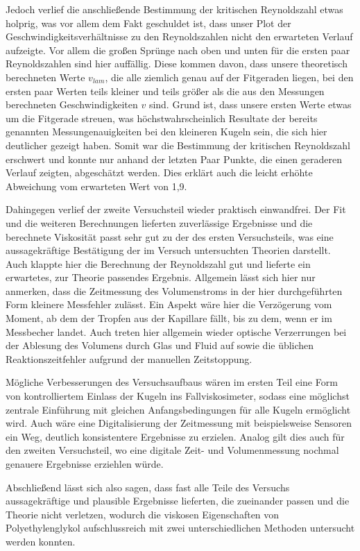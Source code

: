 \documentclass{article}
\begin{document}
Jedoch verlief die anschließende Bestimmung der kritischen Reynoldszahl etwas holprig, was vor allem dem Fakt geschuldet ist, dass unser Plot der Geschwindigkeitsverhältnisse zu den Reynoldszahlen nicht den erwarteten Verlauf aufzeigte. Vor allem die großen Sprünge nach oben und unten für die ersten paar Reynoldszahlen sind hier auffällig. Diese kommen davon, dass unsere theoretisch berechneten Werte $v_{lam}$, die alle ziemlich genau auf der Fitgeraden liegen, bei den ersten paar Werten teils kleiner und teils größer als die aus den Messungen berechneten Geschwindigkeiten $v$ sind. Grund ist, dass unsere ersten Werte etwas um die Fitgerade streuen, was höchstwahrscheinlich Resultate der bereits genannten Messungenauigkeiten bei den kleineren Kugeln sein, die sich hier deutlicher gezeigt haben. Somit war die Bestimmung der kritischen Reynoldszahl erschwert und konnte nur anhand der letzten Paar Punkte, die einen geraderen Verlauf zeigten, abgeschätzt werden. Dies erklärt auch die leicht erhöhte Abweichung vom erwarteten Wert von 1,9.

Dahingegen verlief der zweite Versuchsteil wieder praktisch einwandfrei. Der Fit und die weiteren Berechnungen lieferten zuverlässige Ergebnisse und die berechnete Viskosität passt sehr gut zu der des ersten Versuchsteils, was eine aussagekräftige Bestätigung der im Versuch untersuchten Theorien darstellt. Auch klappte hier die Berechnung der Reynoldszahl gut und lieferte ein erwartetes, zur Theorie passendes Ergebnis. Allgemein lässt sich hier nur anmerken, dass die Zeitmessung des Volumenstroms in der hier durchgeführten Form kleinere Messfehler zulässt. Ein Aspekt wäre hier die Verzögerung vom Moment, ab dem der Tropfen aus der Kapillare fällt, bis zu dem, wenn er im Messbecher landet. Auch treten hier allgemein wieder optische Verzerrungen bei der Ablesung des Volumens durch Glas und Fluid auf sowie die üblichen Reaktionszeitfehler aufgrund der manuellen Zeitstoppung.

Mögliche Verbesserungen des Versuchsaufbaus wären im ersten Teil eine Form von kontrolliertem Einlass der Kugeln ins Fallviskosimeter, sodass eine möglichst zentrale Einführung mit gleichen Anfangsbedingungen für alle Kugeln ermöglicht wird. Auch wäre eine Digitalisierung der Zeitmessung mit beispielsweise Sensoren ein Weg, deutlich konsistentere Ergebnisse zu erzielen. Analog gilt dies auch für den zweiten Versuchsteil, wo eine digitale Zeit- und Volumenmessung nochmal genauere Ergebnisse erziehlen würde. 

Abschließend lässt sich also sagen, dass fast alle Teile des Versuchs aussagekräftige und plausible Ergebnisse lieferten, die zueinander passen und die Theorie nicht verletzen, wodurch die viskosen Eigenschaften von Polyethylenglykol aufschlussreich mit zwei unterschiedlichen Methoden untersucht werden konnten. 



\newpage

\end{document}
